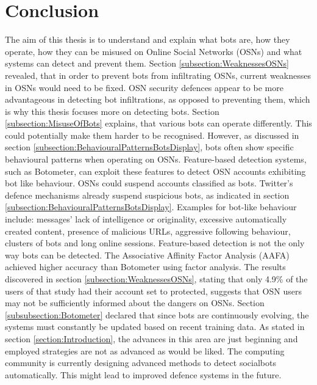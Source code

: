 \section{Conclusion}
\label{sectionb:Conclusion}
The aim of this thesis is to understand and explain what bots are, how they operate, how they can be misused on Online Social Networks (OSNs) and what systems can detect and prevent them. Section \ref{subsection:WeaknessesOSNs} revealed, that in order to prevent bots from infiltrating OSNs, current weaknesses in OSNs would need to be fixed. OSN security defences appear to be more advantageous in detecting bot infiltrations, as opposed to preventing them, which is why this thesis focuses more on detecting bots.
Section \ref{subsection:MisuseOfBots} explains, that various bots can operate differently. This could potentially make them harder to be recognised. However, as discussed in section \ref{subsection:BehaviouralPatternsBotsDisplay}, bots often show specific behavioural patterns when operating on OSNs. Feature-based detection systems, such as Botometer, can exploit these features to detect OSN accounts exhibiting bot like behaviour. OSNs could suspend accounts classified as bots. Twitter's defence mechanisms already suspend suspicious bots, as indicated in section \ref{subsection:BehaviouralPatternsBotsDisplay}. Examples for bot-like behaviour include: messages' lack of intelligence or originality, excessive automatically created content, presence of malicious URLs, aggressive following behaviour, clusters of bots and long online sessions. Feature-based detection is not the only way bots can be detected. The Associative Affinity Factor Analysis (AAFA) achieved higher accuracy than Botometer using factor analysis. The results discovered in section \ref{subsection:WeaknessesOSNs}, stating that only 4.9\% of the users of that study had their account set to protected, suggests that OSN users may not be sufficiently informed about the dangers on OSNs. Section \ref{subsubsection:Botometer} declared that since bots are continuously evolving, the systems must constantly be updated based on recent training data. As stated in section \ref{section:Introduction}, the advances in this area are just beginning and employed strategies are not as advanced as would be liked. The computing community is currently designing advanced methods to detect socialbots automatically. This might lead to improved defence systems in the future. 



